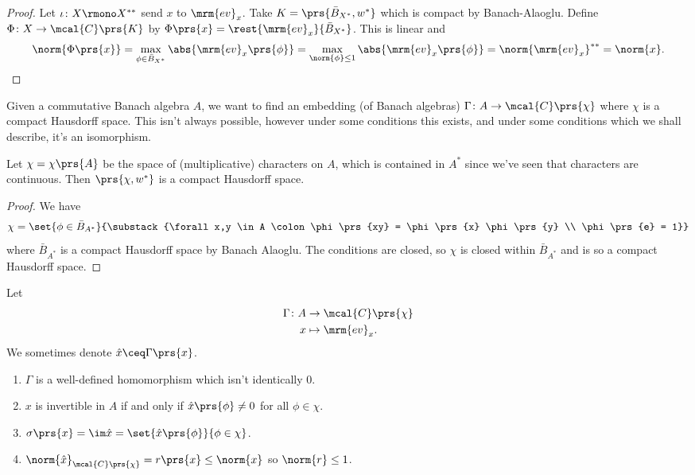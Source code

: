 \documentclass[10pt, twoside]{book}
\begin{document}
\begin{proof}
Let $\iota \colon X \rmono X^{**}$ send $x$ to $\mrm{ev}_x$. Take $K = \prs{\bar{B}_{X^*}, w^*}$ which is compact by Banach-Alaoglu.
Define $\Phi \colon X \to \mcal{C}\prs{K}$ by
$\Phi\prs{x} = \rest{\mrm{ev}_x}{\bar{B}_{X^*}}$. This is linear and
\begin{align*}
\norm{\Phi\prs{x}} = \max_{\phi \in \bar{B}_{X^*}} \abs{\mrm{ev}_x\prs{\phi}} = \max_{\norm{\phi} \leq 1} \abs{\mrm{ev}_x\prs{\phi}} = \norm{\mrm{ev}_x}^{**} = \norm{x} \text{.}
\end{align*}
\end{proof}

Given a commutative Banach algebra $A$, we want to find an embedding (of Banach algebras) $\Gamma \colon A \to \mcal{C}\prs{\chi}$ where $\chi$ is a compact Hausdorff space.
This isn't always possible, however under some conditions this exists, and under some conditions which we shall describe, it's an isomorphism.

\begin{proposition}
Let $\chi = \chi\prs{A}$ be the space of (multiplicative) characters on $A$, which is contained in $A^*$ since we've seen that characters are continuous. Then $\prs{\chi, w^*}$ is a compact Hausdorff space.
\end{proposition}

\begin{proof}
We have
\[\chi = \set{\phi \in \bar{B}_{A^*}}{\substack{\forall x,y \in A \colon \phi\prs{xy} = \phi\prs{x} \phi\prs{y} \\ \phi\prs{e} = 1}}\]
where $\bar{B}_{A^*}$ is a compact Hausdorff space by Banach Alaoglu. The conditions are closed, so $\chi$ is closed within $\bar{B}_{A^*}$ and is so a compact Hausdorff space.
\end{proof}

\begin{definition}
Let
\begin{align*}
\Gamma \colon A &\to \mcal{C}\prs{\chi} \\
x &\mapsto \mrm{ev}_x \text{.}
\end{align*}
We sometimes denote $\hat{x} \ceq \Gamma\prs{x}$.
\end{definition}

\begin{proposition}
\begin{enumerate}
\item $\Gamma$ is a well-defined homomorphism which isn't identically $0$.
\item $x$ is invertible in $A$ if and only if $\hat{x}\prs{\phi} \neq 0$ for all $\phi \in \chi$.
\item $\sigma\prs{x} = \im \hat{x} = \set{\hat{x}\prs{\phi}}{\phi \in \chi}$.
\item $\norm{\hat{x}}_{\mcal{C}\prs{\chi}} = r\prs{x} \leq \norm{x}$ so $\norm{r} \leq 1$.
\end{enumerate}
\end{proposition}
\end{document}

